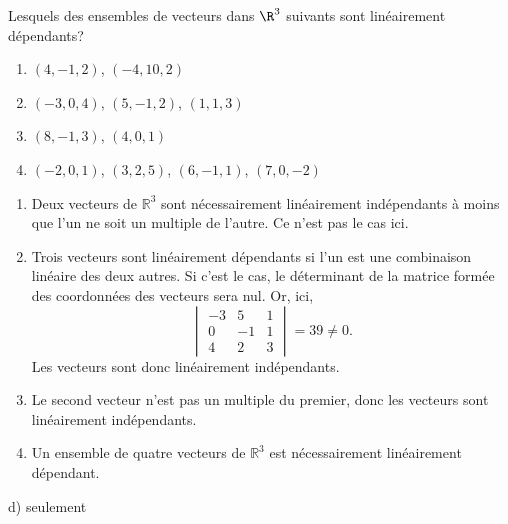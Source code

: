 \begin{exercice}
  Lesquels des ensembles de vecteurs dans $\R^3$ suivants sont
  linéairement dépendants?
  \begin{enumerate}
  \item $( 4, -1,  2)$, $(-4, 10,  2)$
  \item $(-3,  0,  4)$, $( 5, -1,  2)$, $( 1,  1,  3)$
  \item $( 8, -1,  3)$, $( 4,  0,  1)$
  \item $(-2,  0,  1)$, $( 3,  2,  5)$, $( 6, -1,  1)$, $(7, 0, -2)$
  \end{enumerate}
  \begin{sol}
    \begin{enumerate}
    \item Deux vecteurs de $\mathbb{R}^3$ sont nécessairement
      linéairement indépendants à moins que l'un ne soit un multiple
      de l'autre. Ce n'est pas le cas ici.
    \item Trois vecteurs sont linéairement dépendants si l'un est une
      combinaison linéaire des deux autres. Si c'est le cas, le
      déterminant de la matrice formée des coordonnées des vecteurs
      sera nul. Or, ici,
      \begin{displaymath}
        \begin{vmatrix}
          -3 & 5 & 1 \\ 0 & -1 & 1 \\ 4 & 2 & 3
        \end{vmatrix} = 39 \neq 0.
      \end{displaymath}
      Les vecteurs sont donc linéairement indépendants.
    \item Le second vecteur n'est pas un multiple du premier, donc les
      vecteurs sont linéairement indépendants.
    \item Un ensemble de quatre vecteurs de $\mathbb{R}^3$ est
      nécessairement linéairement dépendant.
    \end{enumerate}
  \end{sol}
  \begin{rep}
    d) seulement
  \end{rep}
\end{exercice}

